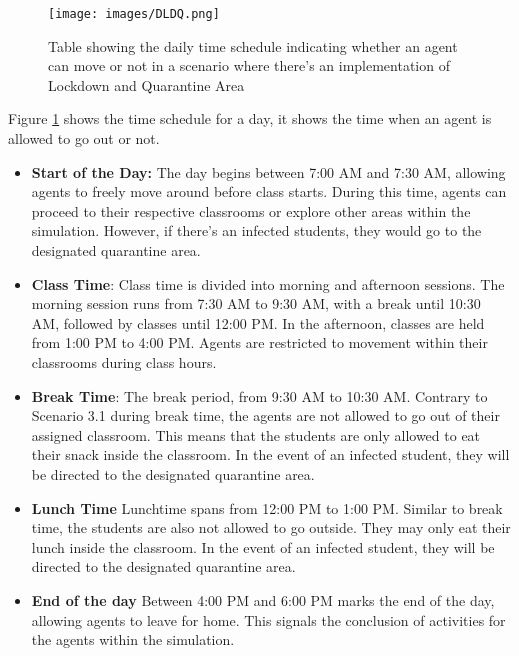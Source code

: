 \begin{figure}[H]
	\centering
	\texttt{[image: images/DLDQ.png]}
	\caption{Table showing the daily time schedule indicating whether an agent can move or not in a scenario where there's an implementation of Lockdown and Quarantine Area}
	\label{3.2C} 
\end{figure}

Figure \ref{3.2C} shows the time schedule for a day, it shows the time when an agent is allowed to go out or not.


\begin{itemize}
	\item \textbf{Start of the Day:} The day begins between 7:00 AM and 7:30 AM, allowing agents to freely move around before class starts. During this time, agents can proceed to their respective classrooms or explore other areas within the simulation. However, if there's an infected students, they would go to the designated quarantine area.
	
	\item \textbf{Class Time}: Class time is divided into morning and afternoon sessions. The morning session runs from 7:30 AM to 9:30 AM, with a break until 10:30 AM, followed by classes until 12:00 PM. In the afternoon, classes are held from 1:00 PM to 4:00 PM. Agents are restricted to movement within their classrooms during class hours.
	
	\item \textbf{Break Time}: The break period, from 9:30 AM to 10:30 AM. Contrary to Scenario 3.1 during break time, the agents are not allowed to go out of their assigned classroom. This means that the students are only allowed to eat their snack inside the classroom. In the event of an infected student, they will be directed to the designated quarantine area.
	
	\item \textbf{Lunch Time} Lunchtime spans from 12:00 PM to 1:00 PM. Similar to break time, the students are also not allowed to go outside. They may only eat their lunch inside the classroom. In the event of an infected student, they will be directed to the designated quarantine area.
	
	\item \textbf{End of the day} Between 4:00 PM and 6:00 PM marks the end of the day, allowing agents to leave for home. This signals the conclusion of activities for the agents within the simulation.
\end{itemize}

